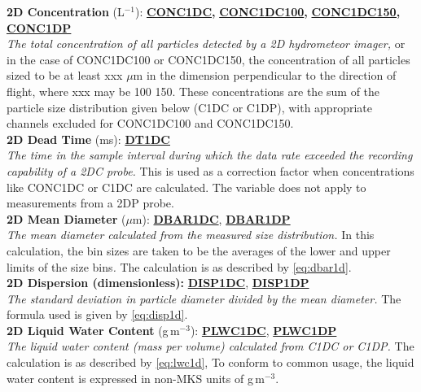 \begin{hangparagraphs}
\textbf{2D Concentration }(L$^{-1}$):\textbf{
}\textbf{\uline{CONC1DC}}\textbf{,
}\textbf{\uline{CONC1DC100}}\textbf{,
}\textbf{\uline{CONC1DC150,}}\textbf{
}\textbf{\uline{CONC1DP}}\textbf{}\textbf{\uline{}}\\
\emph{The total concentration of all particles
detected by a 2D hydrometeor imager,} or in the case of CONC1DC100
or CONC1DC150, the concentration of all particles sized to be at least
xxx $\mu$m in the dimension perpendicular to the direction of flight,
where xxx may be 100 150. These concentrations are the sum of the
particle size distribution given below (C1DC or C1DP), with appropriate
channels excluded for CONC1DC100 and CONC1DC150.\\

\textbf{2D Dead Time }(ms):\textbf{ }\textbf{\uline{DT1DC}}\\
\emph{The time in the sample interval during which
the data rate exceeded the recording capability of a 2DC probe.} This
is used as a correction factor when concentrations like CONC1DC or
C1DC are calculated. The variable does not apply to measurements from
a 2DP probe.\\

\textbf{2D Mean Diameter }($\mu$m):\textbf{
}\textbf{\uline{DBAR1DC}},
\textbf{\uline{DBAR1DP}}\\
\emph{The mean diameter calculated
from the measured size distribution. }In this calculation, the bin
sizes are taken to be the averages of the lower and upper limits of
the size bins\emph{. }The calculation is as described by \eqref{eq:dbar1d}.\emph{
}\\

\textbf{2D Dispersion (dimensionless):}\textbf{
}\textbf{\uline{DISP1DC}},
\textbf{\uline{DISP1DP}}\\
\emph{The standard deviation in particle diameter
divided by the mean diameter.} The formula used is given by \eqref{eq:disp1d}.\\

\textbf{2D Liquid Water Content} (g\,m$^{-3}$):\textbf{
}\textbf{\uline{PLWC1DC}},
\textbf{\uline{PLWC1DP}}\\
\emph{The liquid water content (mass
per volume) calculated from C1DC or C1DP.} The calculation is as described
by \eqref{eq:lwc1d}, To conform to common usage, the liquid water
content is expressed in non-MKS units of g\,m$^{-3}$. \\


\end{hangparagraphs}
